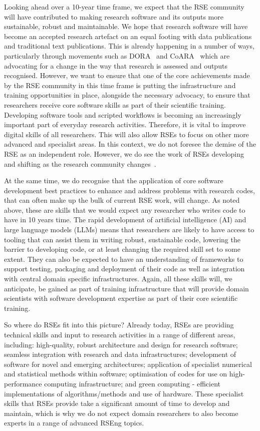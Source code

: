 \documentclass{eceasst}
\begin{document}
Looking ahead over a 10-year time frame, we expect that the RSE community will have
contributed to making research software and its outputs
more sustainable, robust and maintainable.
We hope that research software will have become an accepted research artefact on an equal footing with data publications and traditional text publications.
This is already happening in a number of ways,
particularly through movements such as DORA~\cite{DORA} and CoARA~\cite{COARA} which are advocating for a change in the way that research is assessed and outputs recognised.
However, we want to ensure that one of the core achievements made by the RSE community in this time
frame is putting the infrastructure and training opportunities in place, alongside the necessary
advocacy, to ensure that researchers receive core software skills as part of their scientific training.
Developing software tools and scripted workflows is becoming an increasingly important part of everyday
research activities.
Therefore, it is vital to improve digital skills of all researchers.
This will also allow RSEs to focus on other more advanced and specialist areas.
In this context, we do not foresee the demise of the RSE as an independent role.
However, we do see the work of RSEs developing and shifting as the research community changes~\cite{ChueHong2025}.

At the same time, we do recognise that the application of core software development best practices
to enhance and address problems with research codes, that can often make up the bulk of current RSE work, will change.
As noted above, these are skills that we would expect any researcher who writes code to have in 10 years time.
The rapid development of artificial intelligence (AI) and large language models
(LLMs) means that researchers are likely to have access to tooling that can assist
them in writing robust, sustainable code, lowering the barrier to developing code,
or at least changing the required skill set to some extent.
They can also be expected to have an understanding of frameworks to support testing, packaging and
deployment of their code as well as integration with central domain specific infrastructures.
Again, all these skills will, we anticipate, be gained as part of training infrastructure that will
provide domain scientists with software development expertise as part of their core scientific training.

So where do RSEs fit into this picture?
Already today, RSEs are providing technical skills and input to research activities in a range of different areas, including:
high-quality, robust architecture and design for research software;
seamless integration with research and data infrastructures;
development of software for novel and emerging architectures;
application of specialist numerical and statistical methods within software;
optimisation of codes for use on high-performance computing infrastructure;
and green computing - efficient implementations of algorithms/methods and use of hardware.
These specialist skills that RSEs provide take a significant amount of time to develop and maintain,
which is why we do not expect domain researchers to also become experts in a range of advanced RSEng topics.
\end{document}

